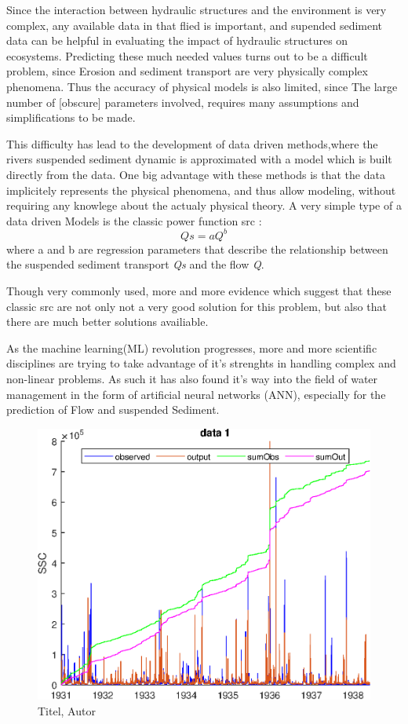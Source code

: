 Since the interaction between hydraulic structures and the environment is very complex, any available data in that flied is important, and supended sediment data can be helpful in evaluating the impact of hydraulic structures on ecosystems.
Predicting these much needed values turns out to be a difficult problem, since Erosion and sediment transport are very physically complex phenomena. Thus the accuracy of physical models is also limited, since The large number of [obscure] parameters involved, requires many assumptions and simplifications to be made.

This difficulty has lead to the development of data driven methods,where the rivers suspended sediment dynamic is approximated with a model which is built directly from the data. One big advantage with these methods is that the data implicitely represents the physical phenomena, and thus allow modeling, without requiring any knowlege about the actualy physical theory. 
A very simple type of a data driven Models is the classic power function \gls{src} \cite{Jansson}:
\begin{equation}\label{eq:emc}
Qs=aQ^{b}
\end{equation}   
where a and b are regression parameters that describe the relationship between the suspended sediment transport \textit{Qs} and the flow \textit{Q}.

 Though very commonly used, more and more evidence which suggest that these classic \gls{src} are not only not a very good solution for this problem, but also that there are much better solutions availiable. \cite{past}




As the machine learning(ML) revolution progresses, more and more scientific disciplines are trying to take advantage of it's strenghts in handling complex and non-linear problems. As such it has also found it's way into the field of water management in the form of artificial neural networks (ANN), especially for the prediction of Flow and suspended Sediment.


\begin{figure}[!ht]
\noindent\hspace{0.5mm}\includegraphics[width=12cm]{./Ressourcen/epsFig}
\caption{Titel, Autor}
\end{figure}

